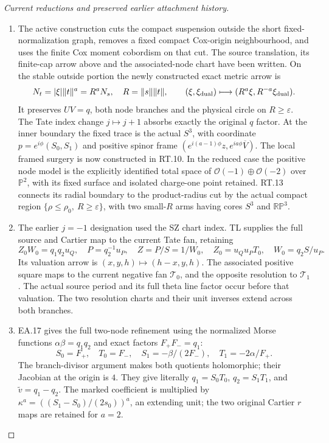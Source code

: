 \begin{proof}[Current reductions and preserved earlier attachment history]
\begin{enumerate}[label=\arabic*.]
\item The active construction cuts the compact suspension outside
the short fixed-normalization graph, removes a fixed compact
Cox-origin neighbourhood, and uses the finite Cox moment
cobordism on that cut. The source translation, its finite-cap
arrow above and the associated-node chart have been written.
On the stable outside portion the newly constructed exact
metric arrow is
\[
 N_t=|\xi|\|t\|^a=R^aN_s,\quad R=\|s\|\|t\|,\qquad
 (\xi,\xi_{\rm dual})\longmapsto
 (R^a\xi,R^{-a}\xi_{\rm dual}).
\]
It preserves \(UV=q\), both node branches and the physical
circle on \(R\ge\varepsilon\). The Tate index change
\(j\mapsto j+1\) absorbs exactly the original \(q\)
factor. At the inner boundary the fixed trace is the actual
\(S^3\), with coordinate \(p=e^{i\phi}(S_0,S_1)\) and
positive spinor frame
\((e^{i(a-1)\phi}z,e^{ia\phi}\overline V)\).
The local framed surgery is now constructed in RT.10. In the
reduced case the positive node model is the explicitly identified
total space of \(\mathcal O(-1)\oplus\mathcal O(-2)\) over
\(\mathbb P^2\), with its fixed surface and isolated charge-one
point retained. RT.13 connects its radial boundary to the
product-radius cut by the actual compact region
\(\{\rho\le\rho_0,\ R\ge\varepsilon\}\), with two small-\(R\)
arms having cores \(S^3\) and \(\mathbb{RP}^3\).

\item The earlier \(j=-1\) designation used the SZ chart index.
TL supplies the full source and Cartier map to the current Tate
fan, retaining
\[
 Z_0W_0=q_1q_2u_Q,\quad P=q_2^{-1}u_P,\quad
 Z=P/S=1/W_0,\quad Z_0=u_Qu_PT_0,\quad W_0=q_2S/u_P.
\]
Its valuation arrow is \((x,y,h)\mapsto(h-x,y,h)\).
The associated positive square maps to the current negative
fan \(\mathcal T_0\), and the opposite resolution to
\(\mathcal T_1\). The actual source period and its full theta
line factor occur before that valuation. The two resolution
charts and their unit inverses extend across both branches.

\item EA.17 gives the full two-node refinement using the normalized
Morse functions \(\alpha\beta=q_1q_2\) and exact factors
\(F_+F_-=q_1\):
\[
 S_0=F_+,\quad T_0=F_-,\quad
 S_1=-\beta/(2F_-),\quad T_1=-2\alpha/F_+.
\]
The branch-divisor argument makes both quotients holomorphic;
their Jacobian at the origin is \(4\). They give literally
\(q_1=S_0T_0\), \(q_2=S_1T_1\), and
\(\widetilde v=q_1-q_2\). The marked coefficient is multiplied
by \(\kappa^a=((S_1-S_0)/(2s_0))^a\), an extending unit;
the two original Cartier \(r\) maps are retained for \(a=2\).


\end{enumerate}
\end{proof}
